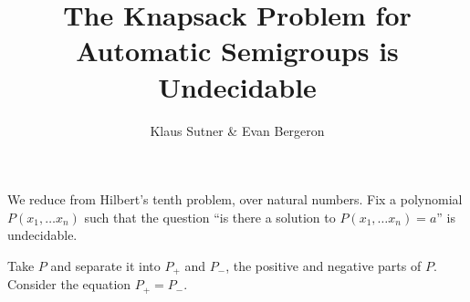 \documentclass{article}
\title{The Knapsack Problem for Automatic Semigroups is Undecidable}
\author{Klaus Sutner \& Evan Bergeron}
\newcommand{\0}{\underline{0}}
\newcommand{\1}{\underline{1}}
\newcommand{\2}{\underline{2}}
\begin{document}
\maketitle
We reduce from Hilbert's tenth problem, over natural numbers. Fix a polynomial $P(x_1, \ldots x_n)$ such that the question ``is there a solution to $P(x_1, \ldots x_n) = a$'' is undecidable.



Take $P$ and separate it into $P_+$ and $P_-$, the positive and negative parts of $P$. Consider the equation $P_+ = P_-$.
\end{document}
